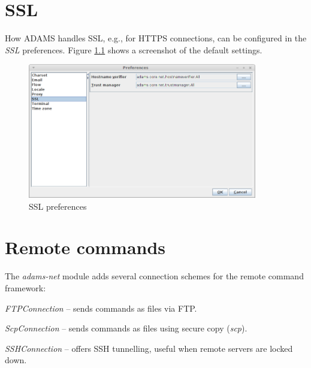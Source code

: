 \documentclass[a4paper]{book}
\begin{document}

\chapter{SSL}
How ADAMS handles SSL, e.g., for HTTPS connections, can be configured in the
\textit{SSL} preferences. Figure \ref{ssl_setup} shows a screenshot of the
default settings.

\begin{figure}[htb]
  \centering
  \includegraphics[width=10.0cm]{images/ssl_setup.png}
  \caption{SSL preferences}
  \label{ssl_setup}
\end{figure}


\chapter{Remote commands}

The \textit{adams-net} module adds several connection schemes for the
remote command framework:

\begin{tight_itemize}
	\item \textit{FTPConnection} -- sends commands as files via FTP.
	\item \textit{ScpConnection} -- sends commands as files using secure
	copy (\textit{scp}).
	\item \textit{SSHConnection} -- offers SSH tunnelling, useful when
	remote servers are locked down.
\end{tight_itemize}


\end{document}
